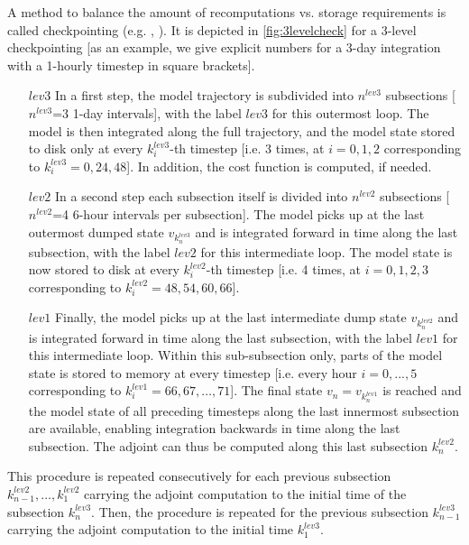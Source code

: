 A method to balance the amount of recomputations vs.
storage requirements is called {\sf checkpointing}
(e.g. \cite{gri:92}, \cite{res-eta:98}).
It is depicted in \ref{fig:3levelcheck} for a 3-level checkpointing
[as an example, we give explicit numbers for a 3-day 
integration with a 1-hourly timestep in square brackets].
\begin{itemize}
%
\item [$lev3$]
In a first step, the model trajectory is subdivided into 
$ {n}^{lev3} $ subsections [$ {n}^{lev3} $=3 1-day intervals],
with the label $lev3$ for this outermost loop.
The model is then integrated along the full trajectory,
and the model state stored to disk only at every $ k_{i}^{lev3} $-th timestep 
[i.e. 3 times, at
$ i = 0,1,2 $ corresponding to $ k_{i}^{lev3} = 0, 24, 48 $].
In addition, the cost function is computed, if needed.
%
\item [$lev2$]
In a second step each subsection itself is divided into
$ {n}^{lev2} $ subsections
[$ {n}^{lev2} $=4 6-hour intervals per subsection].
The model picks up at the last outermost dumped state 
$ v_{k_{n}^{lev3}} $ and is integrated forward in time along
the last subsection, with the label $lev2$ for this  
intermediate loop. 
The model state is now stored to disk at every $ k_{i}^{lev2} $-th 
timestep 
[i.e. 4 times, at
$ i = 0,1,2,3 $ corresponding to $ k_{i}^{lev2} = 48, 54, 60, 66 $].
%
\item [$lev1$]
Finally, the model picks up at the last intermediate dump state
$ v_{k_{n}^{lev2}} $ and is integrated forward in time along
the last subsection, with the label $lev1$ for this  
intermediate loop.
Within this sub-subsection only, parts of the model state is stored
to memory at every timestep 
[i.e. every hour $ i=0,...,5$ corresponding to 
$ k_{i}^{lev1} = 66, 67, \ldots, 71 $].
The  final state $ v_n = v_{k_{n}^{lev1}} $ is reached
and the model state of all preceding timesteps along the last
innermost subsection are available, enabling integration backwards
in time along the last subsection.
The adjoint can thus be computed along this last 
subsection $k_{n}^{lev2}$. 
%
\end{itemize}
%
This procedure is repeated consecutively for each previous
subsection $k_{n-1}^{lev2}, \ldots, k_{1}^{lev2} $
carrying the adjoint computation to the initial time 
of the subsection $k_{n}^{lev3}$.
Then, the procedure is repeated for the previous subsection
$k_{n-1}^{lev3}$ 
carrying the adjoint computation to the initial time 
$k_{1}^{lev3}$.


